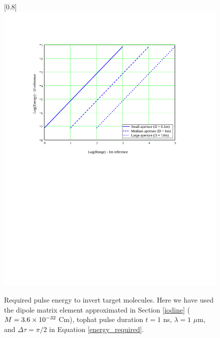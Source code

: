 \begin{figure}
\scalebox{0.8}[0.8]{
\includegraphics[bb=20 390 489 700]
{back_energy/back_energy.pdf}
}
\caption[Required pulse energy to invert target molecules]{Required pulse energy to invert target molecules. Here we have used the dipole matrix element approximated in Section \ref{iodine} ($M=3.6\times10^{-32}$ Cm), tophat pulse duration $t=1$ ns, $\lambda=1$ $\mu$m, and $\Delta \tau=\pi/2$ in Equation \ref{energy_required}.}
\label{back_energy}
\end{figure}
